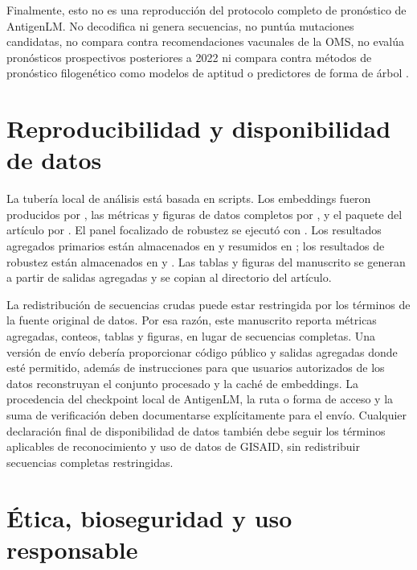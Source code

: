 \documentclass[11pt]{article}
\begin{document}
Finalmente, esto no es una reproducción del protocolo completo de pronóstico de AntigenLM. No decodifica ni genera secuencias, no puntúa mutaciones candidatas, no compara contra recomendaciones vacunales de la OMS, no evalúa pronósticos prospectivos posteriores a 2022 ni compara contra métodos de pronóstico filogenético como modelos de aptitud o predictores de forma de árbol \cite{luksza2014fitness,neher2014predicting,hadfield2018nextstrain}.

\section{Reproducibilidad y disponibilidad de datos}

La tubería local de análisis está basada en scripts. Los embeddings fueron producidos por , las métricas y figuras de datos completos por , y el paquete del artículo por . El panel focalizado de robustez se ejecutó con . Los resultados agregados primarios están almacenados en  y resumidos en ; los resultados de robustez están almacenados en  y . Las tablas y figuras del manuscrito se generan a partir de salidas agregadas y se copian al directorio del artículo.

La redistribución de secuencias crudas puede estar restringida por los términos de la fuente original de datos. Por esa razón, este manuscrito reporta métricas agregadas, conteos, tablas y figuras, en lugar de secuencias completas. Una versión de envío debería proporcionar código público y salidas agregadas donde esté permitido, además de instrucciones para que usuarios autorizados de los datos reconstruyan el conjunto procesado y la caché de embeddings. La procedencia del checkpoint local de AntigenLM, la ruta o forma de acceso y la suma de verificación deben documentarse explícitamente para el envío. Cualquier declaración final de disponibilidad de datos también debe seguir los términos aplicables de reconocimiento y uso de datos de GISAID, sin redistribuir secuencias completas restringidas.

\section{Ética, bioseguridad y uso responsable}
\end{document}
